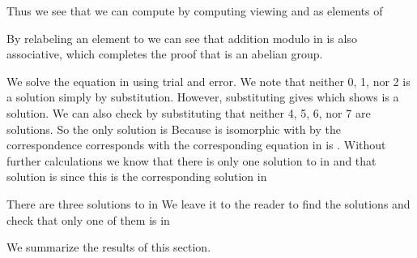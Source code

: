 \documentclass[11pt,oneside]{article}
\begin{document}
\begin{BookBody}

\noindent Thus we see that we can compute  by computing  viewing  and  as elements of 

By relabeling an element  to  we can see that addition modulo  in  is also associative, which completes the proof that  is an abelian group.

 We solve the equation  in  using trial and error. We note that neither 0, 1, nor 2 is a solution simply by substitution. However, substituting  gives  which shows  is a solution. We can also check by substituting that neither 4, 5, 6, nor 7 are solutions. So the only solution is  Because  is isomorphic with  by the correspondence  corresponds with  the corresponding equation in  is . Without further calculations we know that there is only one solution to  in  and that solution is  since this is the corresponding solution in 

There are three solutions to  in  We leave it to the reader to find the solutions and check that only one of them is in \BookEnd{\blacktriangle}

\noindent We summarize the results of this section.






\end{BookBody}
\end{document}
